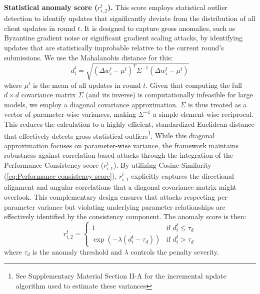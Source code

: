 \documentclass[lettersize,journal]{IEEEtran}
\begin{document}
\textbf{Statistical anomaly score ($r_{i,2}^t$).}
This score employs statistical outlier detection to identify updates that significantly deviate from the distribution of all client updates in round $t$. It is designed to capture gross anomalies, such as Byzantine gradient noise or significant gradient scaling attacks, by identifying updates that are statistically improbable relative to the current round's submissions. We use the Mahalanobis distance for this:
\begin{equation}
d_i^t = \sqrt{(\Delta w_i^t - \mu^t)^T \Sigma^{-1} (\Delta w_i^t - \mu^t)}
\end{equation}
where $\mu^t$ is the mean of all updates in round $t$. Given that computing the full $d \times d$ covariance matrix $\Sigma$ (and its inverse) is computationally infeasible for large models, we employ a diagonal covariance approximation. $\Sigma$ is thus treated as a vector of parameter-wise variances, making $\Sigma^{-1}$ a simple element-wise reciprocal. This reduces the calculation to a highly efficient, standardized Euclidean distance that effectively detects gross statistical outliers\footnote{See Supplementary Material Section II-A for the incremental update algorithm used to estimate these variances}. {While this diagonal approximation focuses on parameter-wise variance, the framework maintains robustness against correlation-based attacks through the integration of the Performance Consistency score ($r_{i,1}^t$). By utilizing Cosine Similarity (\cref{eq:Performance consistency score}), $r_{i,1}^t$ explicitly captures the directional alignment and angular correlations that a diagonal covariance matrix might overlook. This complementary design ensures that attacks respecting per-parameter variance but violating underlying parameter relationships are effectively identified by the consistency component. The anomaly score is then:
\begin{equation}
r_{i,2}^t = \begin{cases}
1 & \text{if } d_i^t \leq \tau_d \\
\exp(-\lambda(d_i^t - \tau_d)) & \text{if } d_i^t > \tau_d
\end{cases}
\end{equation}
where $\tau_d$ is the anomaly threshold and $\lambda$ controls the penalty severity.
}
\end{document}
